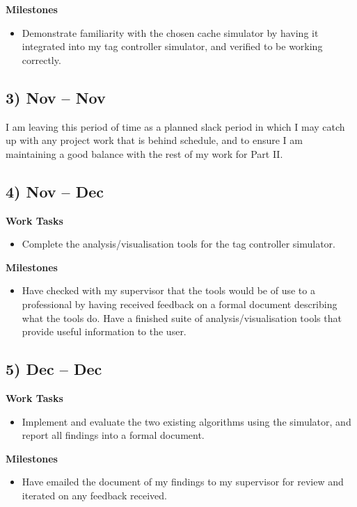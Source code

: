 \documentclass[10pt,a4paper]{article}
\begin{document}
\textbf{Milestones}
\begin{itemize}
	\item Demonstrate familiarity with the chosen cache simulator by having it integrated into my tag controller simulator, and verified to be working correctly.
\end{itemize}

\subsection*{3)  Nov --  Nov}
I am leaving this period of time as a planned slack period in which I may catch up with any project work that is behind schedule, and to ensure I am maintaining a good balance with the rest of my work for Part II.

\subsection*{4)  Nov --  Dec}
\textbf{Work Tasks}
\begin{itemize}
	\item Complete the analysis/visualisation tools for the tag controller simulator.
\end{itemize}

\textbf{Milestones}
\begin{itemize}
	\item Have checked with my supervisor that the tools would be of use to a professional by having received feedback on a formal document describing what the tools do. Have a finished suite of analysis/visualisation tools that provide useful information to the user.
\end{itemize}

\subsection*{5)  Dec --  Dec}
\textbf{Work Tasks}
\begin{itemize}
	\item Implement and evaluate the two existing algorithms using the simulator, and report all findings into a formal document.
\end{itemize}

\textbf{Milestones}
\begin{itemize}
	\item Have emailed the document of my findings to my supervisor for review and iterated on any feedback received.
\end{itemize}
\end{document}

